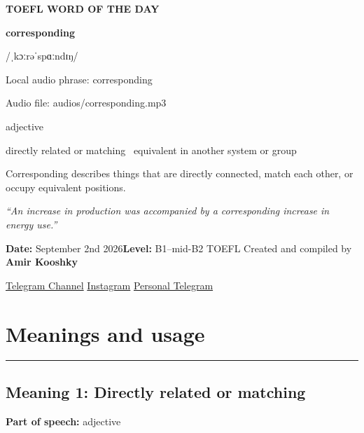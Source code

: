 \documentclass[11pt]{article}
\newcommand{\sectionrule}{\par\vspace{-0.5em}\noindent\textcolor{Accent}{\rule{\linewidth}{0.6pt}}\par}
\begin{document}
\begin{center}
{\sffamily\bfseries\color{Accent} TOEFL WORD OF THE DAY\par}
\vspace{8mm}
{\fontsize{42}{48}\selectfont\bfseries corresponding\par}
\vspace{2mm}
{\Large\sffamily\color{Accent} /ˌkɔːrəˈspɑːndɪŋ/\par}
\vspace{2mm}
{\small\sffamily Local audio phrase: corresponding\par}
{\small\sffamily Audio file: audios/corresponding.mp3\par}
\vspace{2mm}
{\large\sffamily\color{Muted} adjective\par}
\vspace{5mm}
{\sffamily directly related or matching \textbullet\ equivalent in another system or group\par}
\vspace{6mm}
{\large Corresponding describes things that are directly connected, match each other, or occupy equivalent positions.\par}
\vspace{6mm}
\begin{minipage}{0.84\textwidth}
\itshape “An increase in production was accompanied by a corresponding increase in energy use.”
\end{minipage}\par
\vspace{10mm}
\textbf{Date:} September 2nd 2026\quad\textbullet\quad \textbf{Level:} B1--mid-B2 TOEFL
\vfill
Created and compiled by \textbf{Amir Kooshky}\par
\vspace{2mm}
\href{https://t.me/KooshkyTOEFL}{Telegram Channel}\quad\textbullet\quad
\href{https://www.instagram.com/kooshkytoefl}{Instagram}\quad\textbullet\quad
\href{https://t.me/KooshkyTOEFL\_pv}{Personal Telegram}
\end{center}
\newpage
\tableofcontents
\newpage

\section{Meanings and usage}
\sectionrule
\subsection{Meaning 1: Directly related or matching}
\textbf{Part of speech:} adjective
\end{document}
